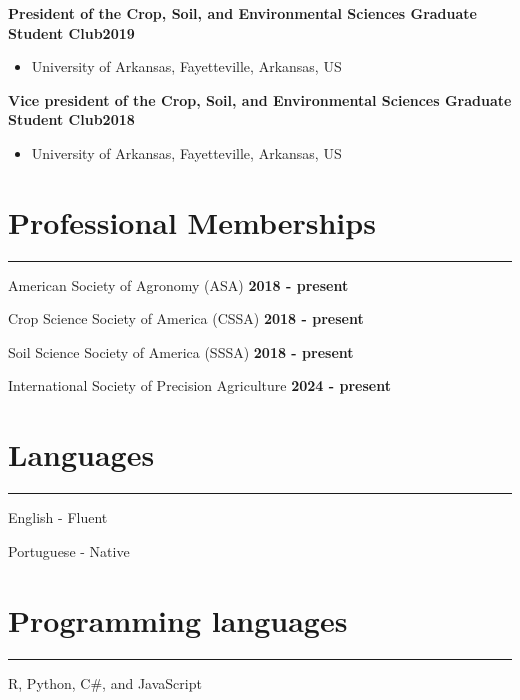 \documentclass[letterpaper,10pt]{article}
\begin{document}
{\bf President of the Crop, Soil, and
Environmental Sciences Graduate Student
Club\hfill  2019} \vspace{-.1in} \begin{itemize}
	\itemsep-0.5em
	\renewcommand\labelitemi{{\boldmath$\cdot$}}
\item University of Arkansas, Fayetteville,
Arkansas, US \end{itemize}

{\bf Vice president of the Crop, Soil, and
Environmental Sciences Graduate Student
Club\hfill  2018}
\vspace{-.1in}
\begin{itemize}
\itemsep-0.5em
\renewcommand\labelitemi{{\boldmath$\cdot$}}
\item University of Arkansas, 
Fayetteville, Arkansas, US
\end{itemize}

\section*{\sc Professional Memberships}
\hrule
\vspace{.1in}
American Society of Agronomy (ASA) \hfill{\bf 2018 - present}

Crop Science Society of America (CSSA) \hfill{\bf 2018 - present}

Soil Science Society of America (SSSA) \hfill{\bf 2018 - present}

International Society of Precision Agriculture \hfill {\bf 2024 - present}

\section*{\sc Languages}
\hrule
\vspace{.1in}
English - Fluent

Portuguese - Native

\section* {\sc Programming languages}
\hrule
\vspace{.1in}
R, Python, C\#, and JavaScript
\end{document}
